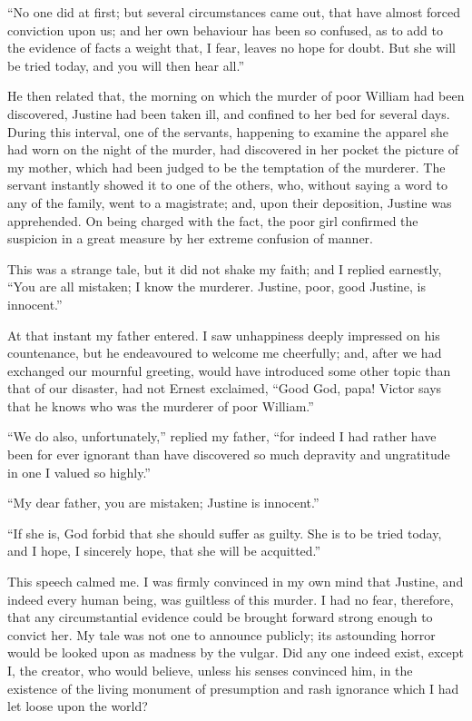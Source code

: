 \documentclass[12pt,openright]{book}
\begin{document}
“No one did at first; but several circumstances came out, that have almost forced conviction upon us; and her own behaviour has been so confused, as to add to the evidence of facts a weight that, I fear, leaves no hope for doubt. But she will be tried today, and you will then hear all.”

He then related that, the morning on which the murder of poor William had been discovered, Justine had been taken ill, and confined to her bed for several days. During this interval, one of the servants, happening to examine the apparel she had worn on the night of the murder, had discovered in her pocket the picture of my mother, which had been judged to be the temptation of the murderer. The servant instantly showed it to one of the others, who, without saying a word to any of the family, went to a magistrate; and, upon their deposition, Justine was apprehended. On being charged with the fact, the poor girl confirmed the suspicion in a great measure by her extreme confusion of manner.

This was a strange tale, but it did not shake my faith; and I replied earnestly, “You are all mistaken; I know the murderer. Justine, poor, good Justine, is innocent.”

At that instant my father entered. I saw unhappiness deeply impressed on his countenance, but he endeavoured to welcome me cheerfully; and, after we had exchanged our mournful greeting, would have introduced some other topic than that of our disaster, had not Ernest exclaimed, “Good God, papa! Victor says that he knows who was the murderer of poor William.”

“We do also, unfortunately,” replied my father, “for indeed I had rather have been for ever ignorant than have discovered so much depravity and ungratitude in one I valued so highly.”

“My dear father, you are mistaken; Justine is innocent.”

“If she is, God forbid that she should suffer as guilty. She is to be tried today, and I hope, I sincerely hope, that she will be acquitted.”

This speech calmed me. I was firmly convinced in my own mind that Justine, and indeed every human being, was guiltless of this murder. I had no fear, therefore, that any circumstantial evidence could be brought forward strong enough to convict her. My tale was not one to announce publicly; its astounding horror would be looked upon as madness by the vulgar. Did any one indeed exist, except I, the creator, who would believe, unless his senses convinced him, in the existence of the living monument of presumption and rash ignorance which I had let loose upon the world?
\end{document}
